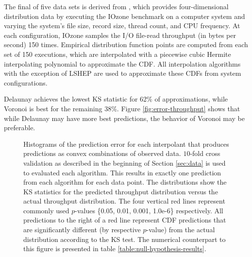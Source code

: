 \documentclass[smallextended,final]{svjour3}       %
\begin{document}
The final of five data sets is derived from \cite{cameron2019moana},
which provides four-dimensional distribution data by executing the
IOzone benchmark \cite{iozone} on a computer system and varying the
system's file size, record size, thread count, and CPU frequency. At
each configuration, IOzone samples the I/O file-read throughput (in
bytes per second) 150 times. Empirical distribution function points
are computed from each set of 150 executions, which are interpolated
with a piecewise cubic Hermite interpolating polynomial
\cite{fritsch1980monotone} to approximate the CDF. All interpolation
algorithms with the exception of LSHEP are used to approximate these
CDFs from system configurations.

Delaunay achieves the lowest KS statistic for 62\% of approximations,
while Voronoi is best for the remaining 38\%. Figure
\ref{fig:error-throughput} shows that while Delaunay may have more
best predictions, the behavior of Voronoi may be preferable.


\begin{figure}
  \centering
  \caption{Histograms of the prediction error for each interpolant
    that produces predictions as convex combinations of observed
    data. $10$-fold cross validation as described in the beginning of
    Section \ref{sec:data} is used to evaluated each algorithm. This
    results in exactly one prediction from each algorithm for each
    data point. The distributions show the KS statistics for the
    predicted throughput distribution versus the actual throughput
    distribution. The four vertical red lines represent commonly used
    $p$-values \{0.05, 0.01, 0.001, 1.0e-6\} respectively. All
    predictions to the right of a red line represent CDF predictions
    that are significantly different (by respective $p$-value) from
    the actual distribution according to the KS test. The numerical
    counterpart to this figure is presented in table
    \ref{table:null-hypothesis-results}.}
  \label{fig:throughput-prediction}
\end{figure}
\end{document}
